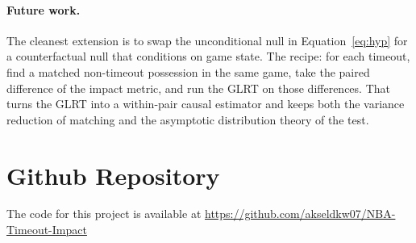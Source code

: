 \documentclass[twoside,11pt]{article}
\begin{document}
\paragraph{Future work.} The cleanest extension is to swap the
unconditional null in Equation~\ref{eq:hyp} for a counterfactual null
that conditions on game state. The recipe: for each timeout, find a
matched non-timeout possession in the same game, take the paired
difference of the impact metric, and run the GLRT on those differences.
That turns the GLRT into a within-pair causal estimator and keeps both
the variance reduction of matching and the asymptotic distribution
theory of the test.

\section*{Github Repository}

The code for this project is available at \url{https://github.com/akseldkw07/NBA-Timeout-Impact}


\newpage


\end{document}
